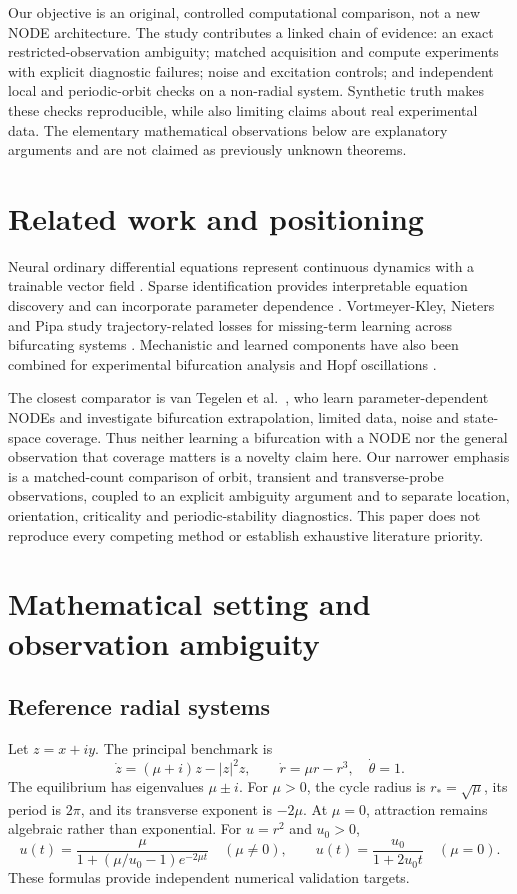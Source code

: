 \documentclass[11pt,a4paper]{article}
\begin{document}
Our objective is an original, controlled computational comparison, not a new NODE architecture. The study contributes a linked chain of evidence: an exact restricted-observation ambiguity; matched acquisition and compute experiments with explicit diagnostic failures; noise and excitation controls; and independent local and periodic-orbit checks on a non-radial system. Synthetic truth makes these checks reproducible, while also limiting claims about real experimental data. The elementary mathematical observations below are explanatory arguments and are not claimed as previously unknown theorems.

\section{Related work and positioning}
Neural ordinary differential equations represent continuous dynamics with a trainable vector field \cite{chen}. Sparse identification provides interpretable equation discovery and can incorporate parameter dependence \cite{brunton}. Vortmeyer-Kley, Nieters and Pipa study trajectory-related losses for missing-term learning across bifurcating systems \cite{vortmeyer}. Mechanistic and learned components have also been combined for experimental bifurcation analysis and Hopf oscillations \cite{beregi,lee}.

The closest comparator is van Tegelen et al.\ \cite{tegelen}, who learn parameter-dependent NODEs and investigate bifurcation extrapolation, limited data, noise and state-space coverage. Thus neither learning a bifurcation with a NODE nor the general observation that coverage matters is a novelty claim here. Our narrower emphasis is a matched-count comparison of orbit, transient and transverse-probe observations, coupled to an explicit ambiguity argument and to separate location, orientation, criticality and periodic-stability diagnostics. This paper does not reproduce every competing method or establish exhaustive literature priority.

\section{Mathematical setting and observation ambiguity}
\subsection{Reference radial systems}
Let $z=x+iy$. The principal benchmark is
\begin{equation}
 \dot z=(\mu+i)z-|z|^2z,\qquad
 \dot r=\mu r-r^3,\quad \dot\theta=1. \label{eq:hopf}
\end{equation}
The equilibrium has eigenvalues $\mu\pm i$. For $\mu>0$, the cycle radius is $r_*=\sqrt{\mu}$, its period is $2\pi$, and its transverse exponent is $-2\mu$. At $\mu=0$, attraction remains algebraic rather than exponential.
For $u=r^2$ and $u_0>0$,
\begin{equation}
u(t)=\frac{\mu}{1+(\mu/u_0-1)e^{-2\mu t}}\quad(\mu\ne0),
\qquad u(t)=\frac{u_0}{1+2u_0t}\quad(\mu=0). \label{eq:exact}
\end{equation}
These formulas provide independent numerical validation targets.
\end{document}
